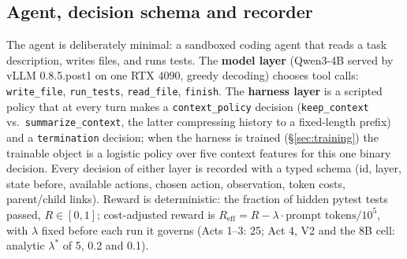 \documentclass{article}
\theoremstyle{remark}
\begin{document}
\subsection{Agent, decision schema and recorder}
The agent is deliberately minimal: a sandboxed coding agent that reads a
task description, writes files, and runs tests. The \textbf{model layer}
(Qwen3-4B served by vLLM 0.8.5.post1 on one RTX 4090, greedy decoding)
chooses tool calls: \texttt{write\_file}, \texttt{run\_tests},
\texttt{read\_file}, \texttt{finish}. The \textbf{harness layer} is a
scripted policy that at every turn makes a \texttt{context\_policy}
decision (\texttt{keep\_context} vs.\ \texttt{summarize\_context}, the
latter compressing history to a fixed-length prefix) and a
\texttt{termination} decision; when the harness is trained
(\S\ref{sec:training}) the trainable object is a logistic policy over
five context features for this one binary decision. Every decision of
either layer is recorded with a typed schema (id, layer, state before,
available actions, chosen action, observation, token costs, parent/child
links). Reward is deterministic: the fraction of hidden pytest tests
passed, $R \in [0,1]$; cost-adjusted reward is $R_{\text{eff}} = R -
\lambda \cdot \text{prompt tokens}/10^5$, with $\lambda$ fixed before
each run it governs (Acts 1--3: 25; Act 4, V2 and the 8B cell: analytic
$\lambda^{*}$ of 5, 0.2 and 0.1).
\end{document}
